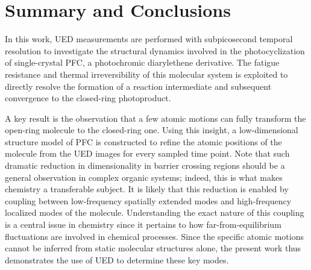 \section{Summary and Conclusions}

In this work, UED measurements are performed with subpicosecond temporal resolution
to investigate the structural dynamics involved in the photocyclization of
single-crystal PFC, a photochromic diarylethene derivative.
%
The fatigue resistance and thermal irreversibility of this molecular system
is exploited to directly resolve the formation of a reaction intermediate
and subsequent convergence to the closed-ring photoproduct.

A key result is the observation that a few atomic motions can fully transform
the open-ring molecule to the closed-ring one.
Using this insight, a low-dimensional structure model of PFC is constructed
to refine the atomic positions of the molecule from the UED images
for every sampled time point.
%
Note that such dramatic reduction in dimensionality in barrier crossing regions
should be a general observation in complex organic systems;
indeed, this is what makes chemistry a transferable subject.
%
It is likely that this reduction is enabled by coupling between
low-frequency spatially extended modes and high-frequency localized modes
of the molecule.
%
Understanding the exact nature of this coupling is a central issue in chemistry
since it pertains to how far-from-equilibrium fluctuations are involved in
chemical processes.
%
Since the specific atomic motions cannot be inferred from static molecular structures alone,
the present work thus demonstrates the use of UED to determine these key modes.
